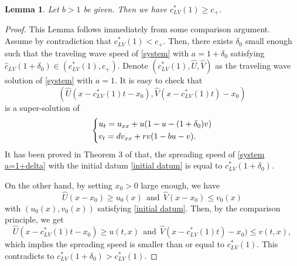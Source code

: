 \documentclass[11pt,a4paper]{article}
\newtheorem{lemma}[theorem]{\textbf{Lemma}}
\numberwithin{equation}{section}
\numberwithin{figure}{section}
\begin{document}
\begin{lemma}\label{prop: c**<hat c}
Let $b>1$ be given. Then we have $c^*_{LV}(1)\ge c_+$.
\end{lemma}
\begin{proof}
This Lemma follows immediately from some comparison argument. Assume by contradiction that $c^*_{LV}(1)< c_+$. Then, there exists $\delta_0$ small enough such that the traveling wave speed of \eqref{system} with $a=1+\delta_0$ satisfying $\hat c_{LV}(1+\delta_0)\in(c^*_{LV}(1),c_{+})$. Denote $(c^*_{LV}(1),\hat U,\hat V)$ as the traveling wave solution of \eqref{system} with $a=1$. It is easy to check that 
$$(\hat U(x-c^*_{LV}(1)t-x_0),\hat V(x-c^*_{LV}(1)t)-x_0)$$ is a super-solution of
\begin{equation}\label{system a=1+delta}
    \left\{\begin{aligned}\relax
    & u_t=u_{xx}+u(1-u-(1+\delta_0)v) \\ 
        & v_t=dv_{xx}+rv(1-bu-v). 
    \end{aligned}\right.
\end{equation}
It has been proved in Theorem 3 of \cite{Peng Wu Zhou} that, the spreading speed of \eqref{system a=1+delta} with the initial datum \eqref{initial datum} is equal to $c^{*}_{LV}(1+\delta_0)$.

On the other hand, by setting $x_0>0$ large enough, we have 
$$\hat U(x-x_0)\ge u_0(x)\ \ \text{and}\ \ \hat V(x-x_0)\le v_0(x)$$
with $(u_0(x),v_0(x))$ satisfying \eqref{initial datum}. Then, by the comparison principle, we get 
$$\hat U(x-c^*_{LV}(1)t-x_0)\ge u(t,x)\ \ \text{and}\ \ \hat V(x-c^*_{LV}(1)t)-x_0)\le v(t,x),$$
which implies the spreading speed is smaller than or equal to $c^*_{LV}(1)$. This contradicts to $c^*_{LV}(1+\delta_0)>c^*_{LV}(1)$.
\end{proof}
\end{document}

